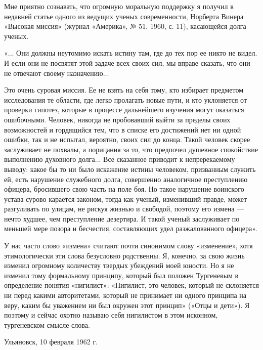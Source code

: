 Мне приятно  сознавать, что огромную  моральную поддержку я  получил в
недавней  статье  одного  из ведущих  ученых  современности,  Норберта
Винера  «Высокая  миссия»  (журнал  «Америка», №  51,  1960,  с.  11),
касающейся долга ученых.

«... Они должны  неутомимо искать истину там, где до  тех пор ее никто
не видел. И если они не посвятят этой задаче всех своих сил, мы вправе
сказать, что они не отвечают своему назначению...

Это  очень суровая  миссия. Ее  не взять  на себя  тому, кто  избирает
предметом исследования те  области, где легко пролагать  новые пути, и
кто  уклоняется от  проверки гипотез,  которые в  процессе дальнейшего
изучения могут  оказаться ошибочными. Человек, никогда  не пробовавший
выйти за  пределы своих  возможностей и гордящийся  тем, что  в списке
его  достижений нет  ни  одной  ошибки, так  и  не испытал,  вероятно,
своих  сил до  конца.  Такой человек  скорее  заслуживает не  похвалы,
а  порицания  за то,  что  предпочел  душевное спокойствие  выполнению
духовного  долга... Все  сказанное приводит  к непререкаемому  выводу:
какое бы то ни было искажение истины человеком, призванным служить ей,
есть нарушение  служебного долга, совершенно  аналогичное преступлению
офицера,  бросившего  свою  часть  на поле  боя.  Но  такое  нарушение
воинского устава сурово карается законом, тогда как ученый, изменивший
правде,  может разгуливать  по улицам,  не рискуя  жизнью и  свободой,
поэтому  его  измена ---  нечто  худшее,  чем преступление  дезертира.
И  такой  ученый  заслуживает  по меньшей  мере  позора  и  бесчестия,
составляющих удел разжалованного офицера».

У нас часто слово «измена»  считают почти синонимом слову «изменение»,
хотя этимологически  эти слова  безусловно родственны. Я,  конечно, за
свою жизнь изменил огромному количеству твердых убеждений моей юности.
Но  я  не  изменил  тому формальному  принципу,  который  был  положен
Тургеневым в  определение понятия «нигилист»: «Нигилист,  это человек,
который  не  склоняется  ни  перед  какими  авторитетами,  который  не
принимает  ни одного  принципа  на  веру, каким  бы  уважением ни  был
окружен  этот принцип»  («Отцы и  дети»).  Я поэтому  и сейчас  охотно
называю себя нигилистом в этом исконном, тургеневском смысле слова.

\begin{flushright} Ульяновск, 10 февраля 1962 г. \end{flushright}

\clearpage


